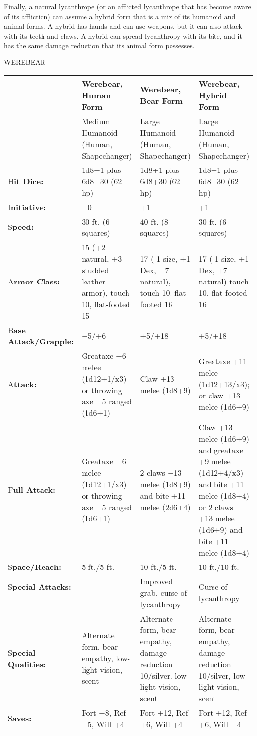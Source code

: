 \documentclass{article}
\begin{document}
Finally, a natural lycanthrope (or an afflicted lycanthrope that has become aware 
of its affliction) can assume a hybrid form that is a mix of its humanoid and animal 
forms. A hybrid has hands and can use weapons, but it can also attack with its 
teeth and claws. A hybrid can spread lycanthropy with its bite, and it has the 
same damage reduction that its animal form possesses.

WEREBEAR

\begin{tabular}{|>{\raggedright}p{67pt}|>{\raggedright}p{78pt}|>{\raggedright}p{78pt}|>{\raggedright}p{78pt}|}
\hline
  & W\textbf{erebear, Human Form} & W\textbf{erebear, Bear Form} & W\textbf{erebear, 
Hybrid Form}\tabularnewline
\hline
  & Medium Humanoid (Human, Shapechanger) & Large Humanoid (Human, Shapechanger) & Large 
Humanoid (Human, Shapechanger)\tabularnewline
\hline
H\textbf{it Dice:} & 1d8+1 plus 6d8+30 (62 hp) & 1d8+1 plus 6d8+30 (62 hp) & 1d8+1 
plus 6d8+30 (62 hp)\tabularnewline
\hline
I\textbf{nitiative:} & +0 & +1 & +1\tabularnewline
\hline
S\textbf{peed:} & 30 ft. (6 squares) & 40 ft. (8 squares) & 30 ft. (6 squares)\tabularnewline
\hline
A\textbf{rmor Class:} & 15 (+2 natural, +3 studded leather armor), touch 10, flat-footed 
15 & 17 (-1 size, +1 Dex, +7 natural), touch 10, flat-footed 16 & 17 (-1 size, 
+1 Dex, +7 natural) touch 10, flat-footed 16\tabularnewline
\hline
B\textbf{ase Attack/Grapple:} & +5/+6 & +5/+18 & +5/+18\tabularnewline
\hline
A\textbf{ttack:} & Greataxe +6 melee (1d12+1/x3) or throwing axe +5 ranged (1d6+1) & Claw 
+13 melee (1d8+9) & Greataxe +11 melee (1d12+13/x3); or claw +13 melee (1d6+9)\tabularnewline
\hline
F\textbf{ull Attack:} & Greataxe +6 melee (1d12+1/x3) or throwing axe +5 ranged 
(1d6+1) & 2 claws +13 melee (1d8+9) and bite +11 melee (2d6+4) & Claw +13 melee 
(1d6+9) and greataxe +9 melee (1d12+4/x3) and bite +11 melee (1d8+4) or 2 claws 
+13 melee (1d6+9) and bite +11 melee (1d8+4)\tabularnewline
\hline
S\textbf{pace/Reach:} & 5 ft./5 ft. & 10 ft./5 ft. & 10 ft./10 ft.\tabularnewline
\hline
S\textbf{pecial Attacks:}--- &  & Improved grab, curse of lycanthropy & Curse of 
lycanthropy\tabularnewline
\hline
S\textbf{pecial Qualities:} & Alternate form, bear empathy, low-light vision, scent & Alternate 
form, bear empathy, damage reduction 10/silver, low-light vision, scent & Alternate 
form, bear empathy, damage reduction 10/silver, low-light vision, scent \tabularnewline
\hline
S\textbf{aves:} & Fort +8, Ref +5, Will +4 & Fort +12, Ref +6, Will +4 & Fort +12, 
Ref +6, Will +4\tabularnewline
\hline

\end{tabular}
\end{document}
